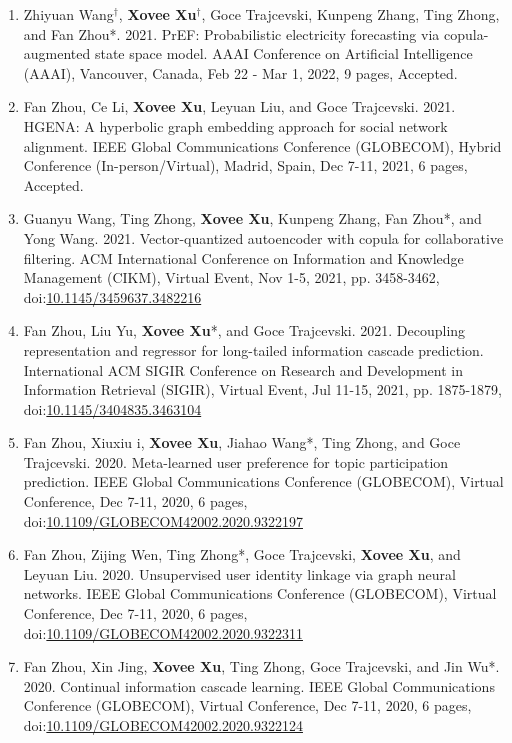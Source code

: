 \begin{enumerate}[resume]
    \item Zhiyuan Wang$^\dagger$, \textbf{Xovee Xu}$^\dagger$, Goce Trajcevski, Kunpeng Zhang, Ting Zhong, and Fan Zhou*. 2021. PrEF: Probabilistic electricity forecasting via copula-augmented state space model. AAAI Conference on Artificial Intelligence (AAAI), Vancouver, Canada, Feb 22 - Mar 1, 2022, 9 pages, Accepted.
    \item Fan Zhou, Ce Li, \textbf{Xovee Xu}, Leyuan Liu, and Goce Trajcevski. 2021. HGENA: A hyperbolic graph embedding approach for social network alignment. IEEE Global Communications Conference (GLOBECOM), Hybrid Conference (In-person/Virtual), Madrid, Spain, Dec 7-11, 2021, 6 pages, Accepted. 
    \item Guanyu Wang, Ting Zhong, \textbf{Xovee Xu}, Kunpeng Zhang, Fan Zhou*, and Yong Wang. 2021. Vector-quantized autoencoder with copula for collaborative filtering. ACM International Conference on Information and Knowledge Management (CIKM), Virtual Event, Nov 1-5, 2021, pp. 3458-3462, doi:\href{https://xovee.cn/html/paper-redirects/cikm2021.html}{10.1145/3459637.3482216}
    \item Fan Zhou, Liu Yu, \textbf{Xovee Xu}*, and Goce Trajcevski. 2021. Decoupling representation and regressor for long-tailed information cascade prediction. International ACM SIGIR Conference on Research and Development in Information Retrieval (SIGIR), Virtual Event, Jul 11-15, 2021, pp. 1875-1879, doi:\href{https://xovee.cn/html/paper-redirects/sigir2021.html}{10.1145/3404835.3463104}
    \item Fan Zhou, Xiuxiu \swashQ i, \textbf{Xovee Xu}, Jiahao Wang*, Ting Zhong, and Goce Trajcevski. 2020. Meta-learned user preference for topic participation prediction. IEEE Global Communications Conference (GLOBECOM), Virtual Conference, Dec 7-11, 2020, 6 pages, doi:\href{https://doi.org/10.1109/GLOBECOM42002.2020.9322197}{10.1109/GLOBECOM42002.2020.9322197}
    \item Fan Zhou, Zijing Wen, Ting Zhong*, Goce Trajcevski, \textbf{Xovee Xu}, and Leyuan Liu. 2020. Unsupervised user identity linkage via graph neural networks. IEEE Global Communications Conference (GLOBECOM), Virtual Conference, Dec 7-11, 2020, 6 pages, doi:\href{https://doi.org/10.1109/GLOBECOM42002.2020.9322311}{10.1109/GLOBECOM42002.2020.9322311}
    \item Fan Zhou, Xin Jing, \textbf{Xovee Xu}, Ting Zhong, Goce Trajcevski, and Jin Wu*. 2020. Continual information cascade learning. IEEE Global Communications Conference (GLOBECOM), Virtual Conference, Dec 7-11, 2020, 6 pages, doi:\href{https://doi.org/10.1109/GLOBECOM42002.2020.9322124}{10.1109/GLOBECOM42002.2020.9322124}

\end{enumerate}
